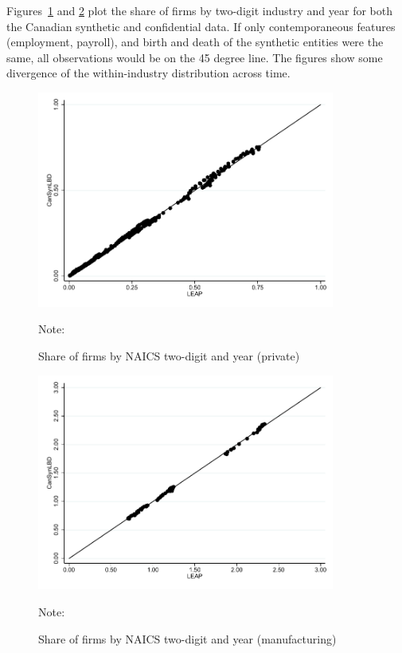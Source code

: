 Figures~\ref{FirmSharePrivate} and \ref{FirmShareManufacturing} plot the share of firms by two-digit industry and year for both the Canadian synthetic  and confidential data. If only contemporaneous features (employment, payroll), and birth and death of the synthetic entities were the same, all observations would be on the 45 degree line. The figures show some divergence of the within-industry distribution across time. 

\begin{figure} [H]
\centering
\caption{Share of firms by NAICS two-digit and year (private)} \label{FirmSharePrivate}
\includegraphics[height=2.8in, width=.7\linewidth]{graphs/Share_of_firms_by_NAICS_two-digit_and_year_private_bw.pdf} 
\begin{minipage}{0.85\textwidth}
{\footnotesize Note: \CanTableNote \par}
\end{minipage}
\end{figure}


\vspace{-15.5pt}
\begin{figure} [H]
\centering
\caption{Share of firms by NAICS two-digit and year (manufacturing)} \label{FirmShareManufacturing}
\includegraphics[height=2.8in, width=.7\linewidth]{graphs/Share_of_firms_by_NAICS_two-digit_and_year_Manufacturing_bw.pdf} 
\begin{minipage}{0.85\textwidth}
{\footnotesize Note: \CanTableNote \par}
\end{minipage}
\end{figure}

